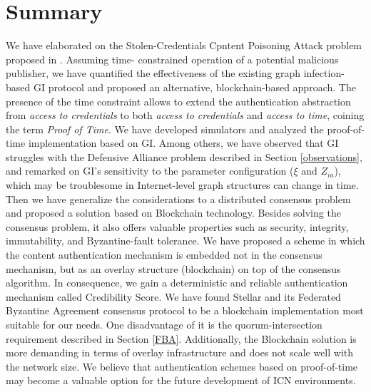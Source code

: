 \chapter{Summary}
We have elaborated on the Stolen-Credentials Cpntent Poisoning Attack problem proposed in \cite{konorski2019mitigating}. Assuming time- constrained operation of a potential malicious publisher, we have quantified the effectiveness of the existing graph infection-based GI protocol and proposed an alternative, blockchain-based approach. The presence of the time constraint allows to extend the authentication abstraction from \textit{access to credentials} to both \textit{access to credentials} and \textit{access to time}, coining the term \textit{Proof of Time}. We have developed simulators and analyzed the proof-of-time implementation based on GI. Among others, we have observed that GI struggles with the Defensive Alliance problem described in Section \ref{observations}, and remarked on GI's sensitivity to the parameter configuration ($\xi$ and $Z_{ia}$), which may be troublesome in Internet-level graph structures can change in time. Then we have generalize the considerations to a distributed consensus problem and proposed a solution based on Blockchain technology. Besides solving the consensus problem, it also offers valuable properties such as security, integrity, immutability, and Byzantine-fault tolerance. We have proposed a scheme in which the content authentication mechanism is embedded not in the consensus mechanism, but as an overlay structure (blockchain) on top of the consensus algorithm. In consequence, we gain a deterministic and reliable authentication mechanism called Credibility Score. We have found Stellar and its Federated Byzantine Agreement consensus protocol to be a blockchain implementation most suitable for our needs. One disadvantage of it is the quorum-intersection requirement described in Section \ref{FBA}. Additionally, the Blockchain solution is more demanding in terms of overlay infrastructure and does not scale well with the network size.
We believe that authentication schemes based on proof-of-time may become a valuable option for the future development of ICN environments.